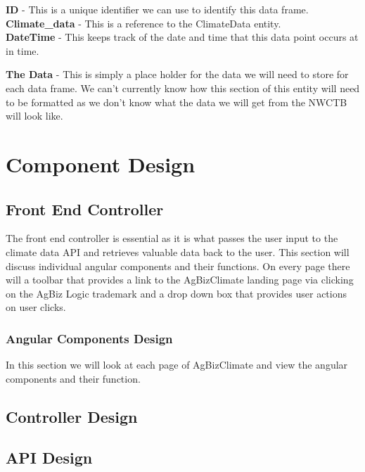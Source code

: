 \documentclass[onecolumn, draftclsnofoot,10pt, compsoc]{article}
\begin{document}
					\textbf{ID} - This is a unique identifier we can use to identify this data frame.\\
					
					\textbf{Climate\_data} - This is a reference to the ClimateData entity.\\
					
					\textbf{DateTime} - This keeps track of the date and time that this data point occurs at in time.
					
					\textbf{The Data} - This is simply a place holder for the data we will need to store for each data frame. We can't currently know how this section of this entity will need to be formatted as we don't know what the data we will get from the NWCTB will look like.\\
				
				
		
		
		
\section{Component Design}

	\subsection{Front End Controller}
		The front end controller is essential as it is what passes the user input to the climate data API and retrieves valuable data back to the user. This section will discuss individual angular components and their functions. On every page there will a toolbar that provides a link to the AgBizClimate landing page via clicking on the AgBiz Logic trademark and a drop down box that provides user actions on user clicks.	
		\subsubsection{Angular Components Design}
		In this section we will look at each page of AgBizClimate and view the angular components and their function.  	

	\subsection{Controller Design}
	
	\subsection{API Design}
\end{document}
